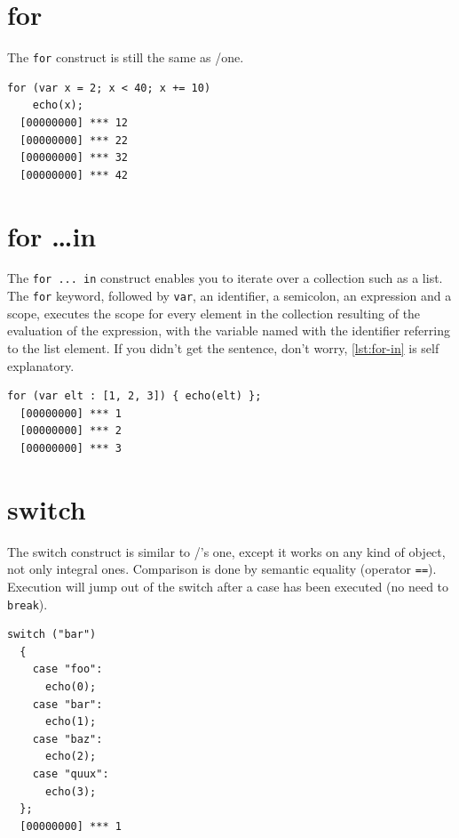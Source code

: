 \documentclass[openright,twoside,12pt]{report}
\newcommand{\lst}[1]{\autoref{lst:#1}}
\begin{document}
\section{for}

The \texttt{for} construct is still the same as \C/\Cxx one.

\begin{lstlisting}[caption=Nihil novi sub sole, label=lst:for]
  for (var x = 2; x < 40; x += 10)
    echo(x);
  [00000000] *** 12
  [00000000] *** 22
  [00000000] *** 32
  [00000000] *** 42
\end{lstlisting}

\section{for \ldots in}

The \texttt{for ... in} construct enables you to iterate over a
collection such as a list. The \texttt{for} keyword, followed by
\lstinline|var|, an identifier, a semicolon, an expression and a
scope, executes the scope for every element in the collection
resulting of the evaluation of the expression, with the variable named
with the identifier referring to the list element. If you didn't get
the sentence, don't worry, \lst{for-in} is self explanatory.

\begin{lstlisting}[caption=Collection iteration with \texttt{for},
  label=lst:for-in]
  for (var elt : [1, 2, 3]) { echo(elt) };
  [00000000] *** 1
  [00000000] *** 2
  [00000000] *** 3
\end{lstlisting}

\section{switch}

The switch construct is similar to \C/\Cxx's one, except it works on
any kind of object, not only integral ones. Comparison is done by
semantic equality (operator \texttt{==}). Execution will jump out of
the switch after a case has been executed (no need to \texttt{break}).

\begin{lstlisting}[caption=The \texttt{switch} construct,
  label=switch]
  switch ("bar")
  {
    case "foo":
      echo(0);
    case "bar":
      echo(1);
    case "baz":
      echo(2);
    case "quux":
      echo(3);
  };
  [00000000] *** 1
\end{lstlisting}
\end{document}
